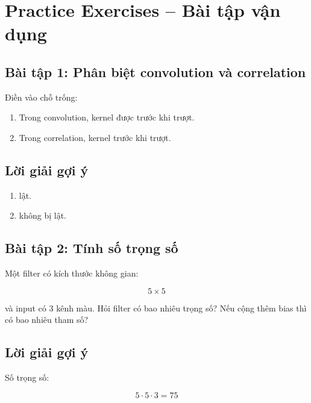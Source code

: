 \section{Practice Exercises -- Bài tập vận dụng}

\subsection*{Bài tập 1: Phân biệt convolution và correlation}

Điền vào chỗ trống:

\begin{enumerate}
    \item Trong convolution, kernel được \underline{\hspace{3cm}} trước khi trượt.
    \item Trong correlation, kernel \underline{\hspace{3cm}} trước khi trượt.
\end{enumerate}

\subsection*{Lời giải gợi ý}

\begin{enumerate}
    \item lật.
    \item không bị lật.
\end{enumerate}

\subsection*{Bài tập 2: Tính số trọng số}

Một filter có kích thước không gian:

\[
    5\times5
\]

và input có 3 kênh màu. Hỏi filter có bao nhiêu trọng số? Nếu cộng thêm bias thì có bao nhiêu tham số?

\subsection*{Lời giải gợi ý}

Số trọng số:

\[
    5\cdot5\cdot3=75
\]

